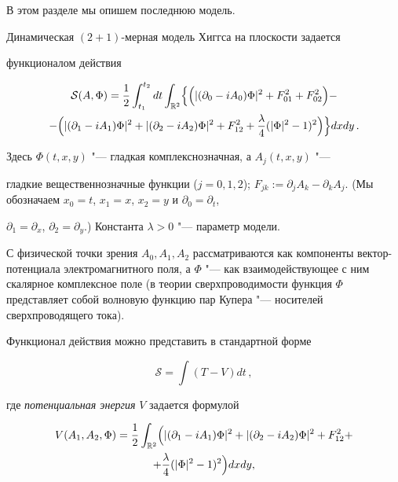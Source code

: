 В этом разделе мы опишем последнюю модель.



Динамическая $(2+1)$-мерная модель Хиггса на плоскости задается

функционалом действия 

\begin{multline}

\label{plainaction}

\mathcal S(A,\Phi)=\dfrac12 \int _{t_1}^{t_2}dt \int _{\mathbb

R^2}

\Bigl\{\Bigl(|(\partial_0-iA_0)\Phi|^2+F_{01}^2+F_{02}^2\Bigr)-\\

-\Bigl(|(\partial_1-iA_1)\Phi|^2+|(\partial_2-iA_2)\Phi|^2+F_{12}^2+

\dfrac{\lambda}4(|\Phi|^2-1)^2\Bigr)\Bigr\} dxdy\,.

\end{multline}

Здесь $\Phi(t,x,y)$ "---  гладкая комплекснозначная, а $A_j(t,x,y)$ "--- 

гладкие вещест\-веннозначные функции ($j=0, 1, 2$); $F_{jk}:=\partial_j

A_k-\partial_k A_j$. (Мы обозначаем ${x_0=t}$, $x_1=x$, $x_2=y$ и $\partial_0=\partial_t$,

$\partial_1=\partial_x$, $\partial_2=\partial_y$.) Константа $\lambda>0$ "---  параметр модели.



С физической точки зрения  $A_0,A_1,A_2$ рассматриваются как компоненты век\-тор-по\-тен\-ци\-ала электромагнитного поля, а $\Phi$ "---  как взаимодействующее с ним скалярное комплексное поле (в теории сверхпроводимости функция $\Phi$ представляет собой волновую функцию пар Купера "---  носителей сверхпроводящего тока).



Функционал действия можно представить в стандартной форме

$$

\mathcal S=\int(T-V)dt\,,

$$

где \textit{потенциальная энергия} $V$ задается формулой

\begin{multline}

\label{plainpotent}

V(A_1,A_2,\Phi)=\dfrac12\int _{\mathbb

R^2}\Bigl(|(\partial_1-iA_1)\Phi|^2+|(\partial_2-iA_2)\Phi|^2+F_{12}^2+ \\

+

\frac{\lambda}4(|\Phi|^2-1)^2\Bigr)dxdy, 

\end{multline}

